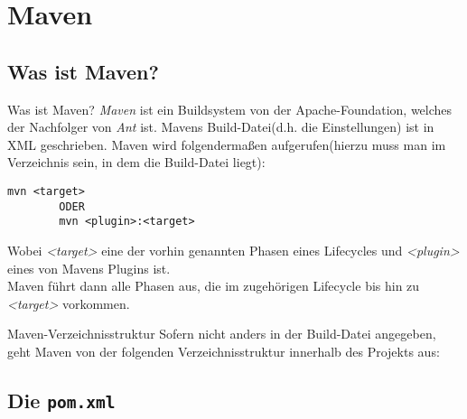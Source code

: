 \section{Maven}
\subsection{Was ist Maven?}

\begin{frame}[fragile]{Was ist Maven?}
    \onslide<+->
    \textit{Maven} ist ein Buildsystem von der Apache-Foundation, welches der Nachfolger von \textit{Ant} ist. Mavens Build-Datei(d.h. die Einstellungen) ist in XML geschrieben.
    \onslide<+->
    Maven wird folgendermaßen aufgerufen(hierzu muss man im Verzeichnis sein, in dem die Build-Datei liegt):
    \begin{lstlisting}[gobble=8]
        mvn <target>
        ODER
        mvn <plugin>:<target>
    \end{lstlisting}
    Wobei \textit{<target>} eine der vorhin genannten Phasen eines Lifecycles und \textit{<plugin>} eines von Mavens Plugins ist.\\
    \onslide<+->
    Maven führt dann alle Phasen aus, die im zugehörigen Lifecycle bis hin zu \textit{<target>} vorkommen.
\end{frame}

\begin{frame}[fragile]{Maven-Verzeichnisstruktur}
    Sofern nicht anders in der Build-Datei angegeben, geht Maven von der folgenden Verzeichnisstruktur innerhalb des Projekts aus:
\end{frame}

\subsection{Die \texttt{pom.xml}}

